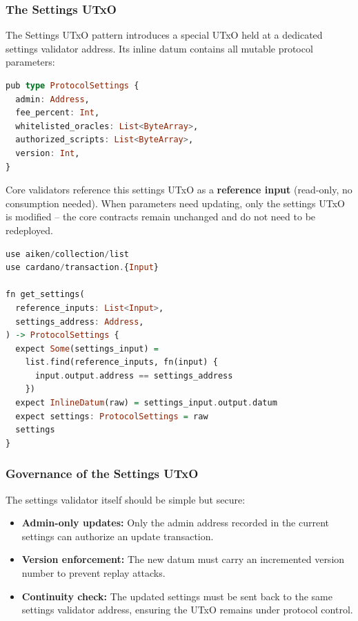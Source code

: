 \subsubsection{The Settings UTxO}

The Settings UTxO pattern introduces a special UTxO held at a dedicated settings validator address. Its inline datum contains all mutable protocol parameters:

\begin{lstlisting}[language=haskell, caption=Settings Datum Structure in Aiken]
pub type ProtocolSettings {
  admin: Address,
  fee_percent: Int,
  whitelisted_oracles: List<ByteArray>,
  authorized_scripts: List<ByteArray>,
  version: Int,
}
\end{lstlisting}

Core validators reference this settings UTxO as a \textbf{reference input} (read-only, no consumption needed). When parameters need updating, only the settings UTxO is modified -- the core contracts remain unchanged and do not need to be redeployed.

\begin{lstlisting}[language=haskell, caption=Reading Settings from a Reference Input]
use aiken/collection/list
use cardano/transaction.{Input}

fn get_settings(
  reference_inputs: List<Input>,
  settings_address: Address,
) -> ProtocolSettings {
  expect Some(settings_input) =
    list.find(reference_inputs, fn(input) {
      input.output.address == settings_address
    })
  expect InlineDatum(raw) = settings_input.output.datum
  expect settings: ProtocolSettings = raw
  settings
}
\end{lstlisting}

\subsubsection{Governance of the Settings UTxO}

The settings validator itself should be simple but secure:

\begin{itemize}
    \item \textbf{Admin-only updates:} Only the admin address recorded in the current settings can authorize an update transaction.
    \item \textbf{Version enforcement:} The new datum must carry an incremented version number to prevent replay attacks.
    \item \textbf{Continuity check:} The updated settings must be sent back to the same settings validator address, ensuring the UTxO remains under protocol control.
\end{itemize}

